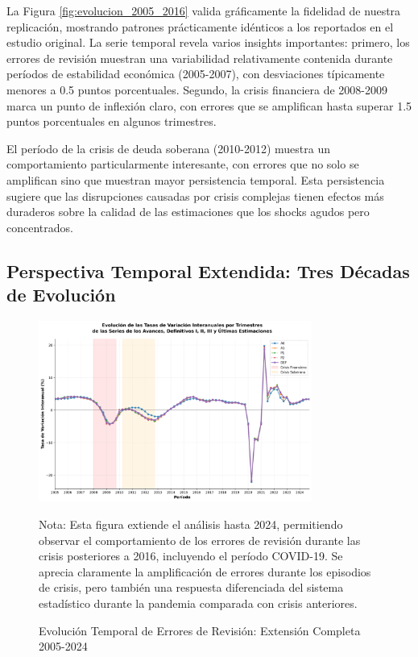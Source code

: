 \documentclass[12pt,a4paper]{article}
\begin{document}
La Figura \ref{fig:evolucion_2005_2016} valida gráficamente la fidelidad de nuestra replicación, mostrando patrones prácticamente idénticos a los reportados en el estudio original. La serie temporal revela varios insights importantes: primero, los errores de revisión muestran una variabilidad relativamente contenida durante períodos de estabilidad económica (2005-2007), con desviaciones típicamente menores a 0.5 puntos porcentuales. Segundo, la crisis financiera de 2008-2009 marca un punto de inflexión claro, con errores que se amplifican hasta superar 1.5 puntos porcentuales en algunos trimestres.

El período de la crisis de deuda soberana (2010-2012) muestra un comportamiento particularmente interesante, con errores que no solo se amplifican sino que muestran mayor persistencia temporal. Esta persistencia sugiere que las disrupciones causadas por crisis complejas tienen efectos más duraderos sobre la calidad de las estimaciones que los shocks agudos pero concentrados.

\subsection{Perspectiva Temporal Extendida: Tres Décadas de Evolución}

\begin{figure}[h]
\centering
\includegraphics[width=0.8\textwidth]{../figuras/figura_2_pavia_robusta_2005_2024.png}
\caption{Evolución Temporal de Errores de Revisión: Extensión Completa 2005-2024}
\label{fig:evolucion_completa}
\begin{flushleft}
\footnotesize
Nota: Esta figura extiende el análisis hasta 2024, permitiendo observar el comportamiento de los errores de revisión durante las crisis posteriores a 2016, incluyendo el período COVID-19. Se aprecia claramente la amplificación de errores durante los episodios de crisis, pero también una respuesta diferenciada del sistema estadístico durante la pandemia comparada con crisis anteriores.
\end{flushleft}
\end{figure}
\end{document}
